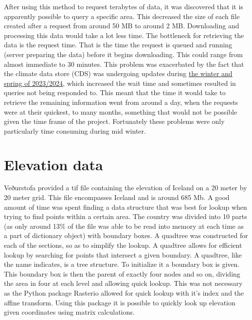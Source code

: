 After using this method to request terabytes of data, it was discovered that it is apparently possible to query a specific area. This decreased the size of each file created after a request from around 50 MB to around 2 MB. Downloading and processing this data would take a lot less time. The bottleneck for retrieving the data is the request time. That is the time the request is queued and running (server preparing the data) before it begins downloading. This could range from almost immediate to 30 minutes. This problem was exacerbated by the fact that the climate data store (CDS) was undergoing updates during \href{https://forum.ecmwf.int/t/a-new-cds-soon-to-be-launched-expect-some-disruptions/1607}{the winter and spring of 2023/2024}, which increased the wait time and sometimes resulted in queries not being responded to. This meant that the time it would take to retrieve the remaining information went from around a day, when the requests were at their quickest, to many months, something that would not be possible given the time frame of the project. Fortunately these problems were only particularly time consuming during mid winter.

\section{Elevation data}
Veðurstofa provided a tif file containing the elevation of Iceland on a 20 meter by 20 meter grid. This file encompasses Iceland and is around 685 Mb. A good amount of time was spent finding a data structure that was best for lookup when trying to find points within a certain area. The country was divided into 10 parts (as only around 13\% of the file was able to be read into memory at each time as a part of dictionary object) with boundary boxes. A quadtree was constructed for each of the sections, so as to simplify the lookup. A quadtree allows for efficient lookup by searching for points that intersect a given boundary. A quadtree, like the name indicates, is a tree structure. To initialize it a boundary box is given. This boundary box is then the parent of exactly four nodes and so on, dividing the area in four at each level and allowing quick lookup. This was not necessary as the Python package Rasterio allowed for quick lookup with it's index and the affine transform. Using this package it is possible to quickly look up elevation given coordinates using matrix calculations.